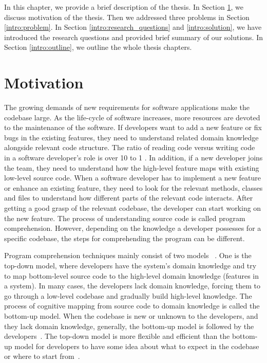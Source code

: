 In this chapter, we provide a brief description of the thesis. In Section \ref{intro:motivation}, we discuss motivation of the thesis. Then we addressed three problems in Section \ref{intro:problem}. In Section \ref{intro:research_questions} and \ref{intro:solution}, we have introduced the research questions and provided brief summary of our solutions. In Section \ref{intro:outline}, we outline the whole thesis chapters. 


\section{Motivation}
\label{intro:motivation}
  The growing demands of new requirements for software applications make the codebase large. As the life-cycle of software increases, more resources are devoted to the maintenance of the software. If developers want to add a new feature or fix bugs in the existing features, they need to understand related domain knowledge alongside relevant code structure. The ratio of reading code versus writing code in a software developer's role is over 10 to 1 \cite{martin2008clean}. In addition, if a new developer joins the team, they need to understand how the high-level feature maps with existing low-level source code. When a software developer has to implement a new feature or enhance an existing feature, they need to look for the relevant methods, classes and files to understand how different parts of the relevant code interacts. After getting a good grasp of the relevant codebase, the developer can start working on the new feature. The process of understanding source code is called program comprehension. However, depending on the knowledge a developer possesses for a specific codebase, the steps for comprehending the program can be different.
 
 
Program comprehension techniques mainly consist of two models ~\cite{tilley1998reverseEngineeringFramework, von1993programToolRequirements, siegmund2016programPastFuture}. One is the top-down model, where developers have the system's domain knowledge and try to map bottom-level source code to the high-level domain knowledge (features in a system). In many cases, the developers lack domain knowledge, forcing them to go through a low-level codebase and gradually build high-level knowledge. The process of cognitive mapping from source code to domain knowledge is called the bottom-up model. When the codebase is new or unknown to the developers, and they lack domain knowledge, generally, the bottom-up model is followed by the developers~\cite{wei2002surveyCategorizationComprehension, siegmund2016programPastFuture}. The top-down model is more flexible and efficient than the bottom-up model for developers to have some idea about what to expect in the codebase or where to start from~\cite{brooks1983theoryComprehensionPrograms}. 
 

